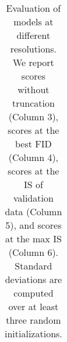 \begin{table}[tbp]
\begin{center}
\begin{tabular}{c|c|c|c|c|c}
\hline
\end{tabular}
\end{center}

\caption{\label{results_table} Evaluation of models at different resolutions. We report scores without truncation (Column 3), scores at the best FID (Column 4), scores at the IS of validation data (Column 5), and scores at the max IS (Column 6). Standard deviations are computed over at least three random initializations.}
\end{table}